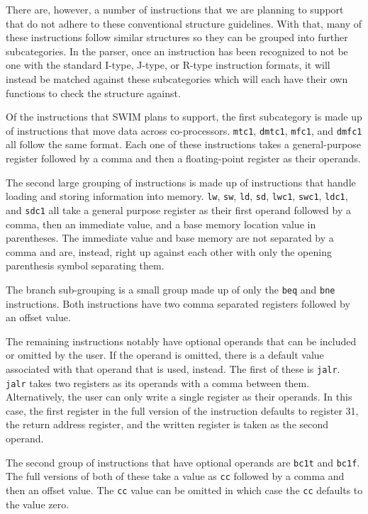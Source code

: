 \documentclass[
    paper=letter,
    parskip=half,
    fontsize=12pt,
    titlepage=firstiscover,
    toc=bibliography,
    numbers=endperiod
]{scrartcl}
\begin{document}
There are, however, a number of instructions that we are planning to
support that do not adhere to these conventional structure guidelines.
With that, many of these instructions follow similar structures so they
can be grouped into further subcategories. In the parser, once an
instruction has been recognized to not be one with the standard I-type,
J-type, or R-type instruction formats, it will instead be matched
against these subcategories which will each have their own functions to
check the structure against.

Of the instructions that SWIM plans to support, the first subcategory is
made up of instructions that move data across co-processors.
\texttt{mtc1}, \texttt{dmtc1}, \texttt{mfc1}, and \texttt{dmfc1} all
follow the same format. Each one of these instructions takes a
general-purpose register followed by a comma and then a floating-point
register as their operands.

The second large grouping of instructions is made up of instructions
that handle loading and storing information into memory. \texttt{lw},
\texttt{sw}, \texttt{ld}, \texttt{sd}, \texttt{lwc1}, \texttt{swc1},
\texttt{ldc1}, and \texttt{sdc1} all take a general purpose register as
their first operand followed by a comma, then an immediate value, and a
base memory location value in parentheses. The immediate value and base
memory are not separated by a comma and are, instead, right up against
each other with only the opening parenthesis symbol separating them.

The branch sub-grouping is a small group made up of only the
\texttt{beq} and \texttt{bne} instructions. Both instructions have two
comma separated registers followed by an offset value.

The remaining instructions notably have optional operands that can be
included or omitted by the user. If the operand is omitted, there is a
default value associated with that operand that is used, instead. The
first of these is \texttt{jalr}. \texttt{jalr} takes two registers as
its operands with a comma between them. Alternatively, the user can only
write a single register as their operands. In this case, the first
register in the full version of the instruction defaults to register 31,
the return address register, and the written register is taken as the
second operand.

The second group of instructions that have optional operands are
\texttt{bc1t} and \texttt{bc1f}. The full versions of both of these take
a value as \texttt{cc} followed by a comma and then an offset value. The
\texttt{cc} value can be omitted in which case the \texttt{cc} defaults
to the value zero.
\end{document}
